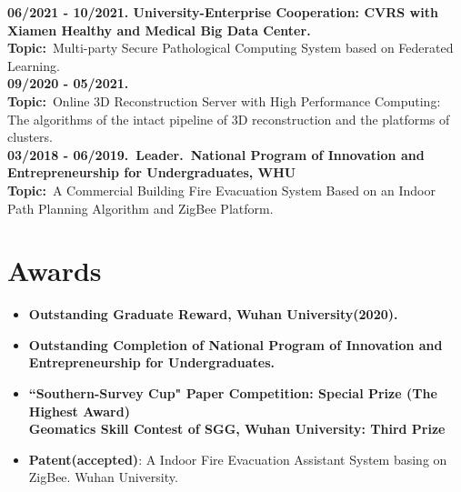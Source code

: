 \documentclass[a4paper]{article}
\begin{document}
\textbf{06/2021 - 10/2021. University-Enterprise Cooperation: CVRS with Xiamen Healthy and Medical Big Data Center.}\\
\textbf{Topic:}\ Multi-party Secure Pathological Computing System based on Federated Learning.\\
\textbf{09/2020 - 05/2021.}\\
\textbf{Topic:}\ Online 3D Reconstruction Server with High Performance Computing: The algorithms of the intact pipeline of 3D reconstruction and the platforms of clusters.\\
\textbf{03/2018 - 06/2019.\ Leader.\ National Program of Innovation and Entrepreneurship for Undergraduates, WHU}\\
\textbf{Topic:}\ A Commercial Building Fire Evacuation System Based on an Indoor Path Planning Algorithm and ZigBee Platform.
\section{Awards}
\vspace{-0.5em}
\begin{itemize}[itemsep = -0.5em,topsep = 0em]
      \item \textbf{Outstanding Graduate Reward, Wuhan University(2020).}
      \item \textbf{Outstanding Completion of National Program of Innovation and Entrepreneurship for Undergraduates.}
      \item \textbf{``Southern-Survey Cup" Paper Competition: Special Prize (The Highest Award)\\
                  Geomatics Skill Contest of SGG, Wuhan University: Third Prize}
      \item \textbf{Patent(accepted)}: A Indoor Fire Evacuation Assistant System basing on ZigBee. Wuhan University.
\end{itemize}
\end{document}
